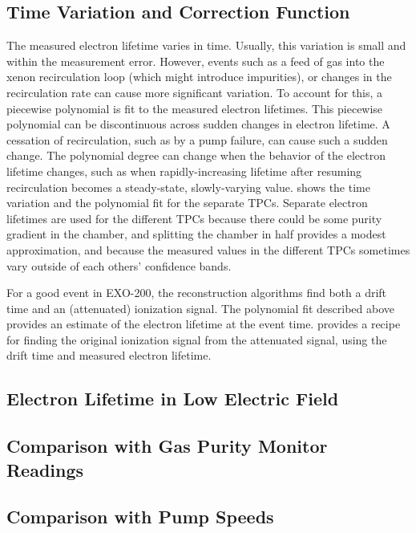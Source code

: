 \documentclass[herrin-thesis.tex]{subfiles}
\begin{document}
\subsection{Time Variation and Correction Function}

The measured electron lifetime varies in time. Usually, this variation is small and within the measurement error. However, events such as a feed of gas into the xenon recirculation loop (which might introduce impurities), or changes in the recirculation rate can cause more significant variation. To account for this, a piecewise polynomial is fit to the measured electron lifetimes. This piecewise polynomial can be discontinuous across sudden changes in electron lifetime. A cessation of recirculation, such as by a pump failure, can cause such a sudden change. The polynomial degree can change when the behavior of the electron lifetime changes, such as when rapidly-increasing lifetime after resuming recirculation becomes a steady-state, slowly-varying value.  shows the time variation and the polynomial fit for the separate TPCs. Separate electron lifetimes are used for the different TPCs because there could be some purity gradient in the chamber, and splitting the chamber in half provides a modest approximation, and because the measured values in the different TPCs sometimes vary outside of each others' confidence bands.

For a good event in EXO-200, the reconstruction algorithms find both a drift time and an (attenuated) ionization signal. The polynomial fit described above provides an estimate of the electron lifetime at the event time.  provides a recipe for finding the original ionization signal from the attenuated signal, using the drift time and measured electron lifetime.

\subsection{Electron Lifetime in Low Electric Field}

\subsection{Comparison with Gas Purity Monitor Readings}

\subsection{Comparison with Pump Speeds}
\end{document}
